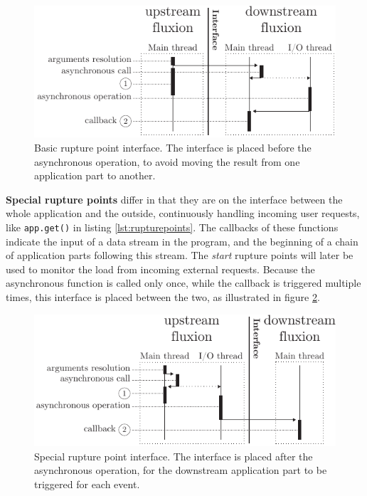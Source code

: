 \begin{figure}[h!]
\begin{center}
  \includegraphics[width=\linewidth]{ressources/basicrp.pdf}
  \caption{Basic rupture point interface. \textnormal{The interface is placed before the asynchronous operation, to avoid moving the result from one application part to another.}}
  \label{fig:basicrp}
\end{center}
\end{figure}

\textbf{Special rupture points} differ in that they are on the interface between the whole application and the outside, continuously handling incoming user requests, like \texttt{app.get()} in listing \ref{lst:rupturepoints}.
The callbacks of these functions indicate the input of a data stream in the program, and the beginning of a chain of application parts following this stream.
The \textit{start} rupture points will later be used to monitor the load from incoming external requests.
Because the asynchronous function is called only once, while the callback is triggered multiple times, this interface is placed between the two, as illustrated in figure \ref{fig:specialrp}.

\begin{figure}[h!]
\begin{center}
  \includegraphics[width=\linewidth]{ressources/specialrp.pdf}
  \caption{Special rupture point interface. \textnormal{The interface is placed after the asynchronous operation, for the downstream application part to be triggered for each event.}}
  \label{fig:specialrp}
\end{center}
\end{figure}

